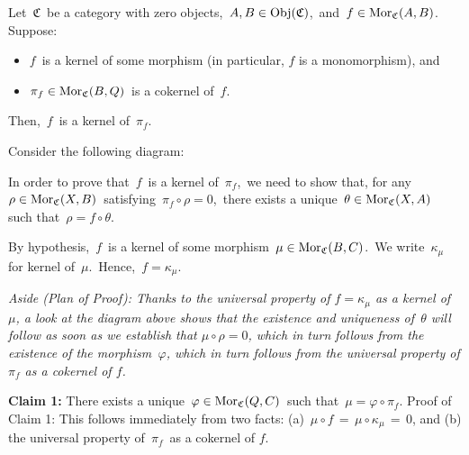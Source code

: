 \vskip 0.5cm
\begin{lemma}
\label{AMorphismIsTheKernelOfItsCokernel}
\mbox{}
\vskip 0.1cm
\noindent
Let \,$\mathfrak{C}$\, be a category with zero objects,
\,$A, B \in \textnormal{Obj}(\mathfrak{C})$,\, and
\,$f \in \textnormal{Mor}_{\mathfrak{C}}(A,B)$.\,
\vskip 0.1cm
\noindent
Suppose:
\begin{itemize}
\item
	$f$\, is a kernel of some morphism (in particular, $f$ is a monomorphism), and
\item
	$\pi_{f} \in \textnormal{Mor}_{\mathfrak{C}}(B,Q)$\, is a cokernel of \,$f$.
\end{itemize}
Then, \,$f$\, is a kernel of \,$\pi_{f}$.
\end{lemma}
\proof
Consider the following diagram:
\begin{center}
\end{center}
In order to prove that \,$f$\, is a kernel of \,$\pi_{f}$,\,
we need to show that, for any \,$\rho \in \textnormal{Mor}_{\mathfrak{C}}(X,B)$\,
satisfying \,$\pi_{f} \circ \rho = 0$,\,
there exists a unique \,$\theta \in \textnormal{Mor}_{\mathfrak{C}}(X,A)$\,
such that \,$\rho = f \circ \theta$.\,

\vskip 0.3cm
\noindent
By hypothesis, \,$f$\, is a kernel of some morphism \,$\mu \in \textnormal{Mor}_{\mathfrak{C}}(B,C)$.\,
We write \,$\kappa_{\mu}$\, for kernel of \,$\mu$.\, Hence, \,$f = \kappa_{\mu}$.

\vskip 0.3cm
\noindent
\textit{Aside (Plan of Proof):
Thanks to the universal property of $f = \kappa_{\mu}$ as a kernel of $\mu$,
a look at the diagram above shows that
the existence and uniqueness of \,$\theta$ will follow as soon as we establish
that $\mu \circ \rho = 0$, which in turn follows from the existence of the morphism \,$\varphi$,
which in turn follows from the universal property of $\pi_{f}$ as a cokernel of $f$.}

\vskip 0.3cm
\noindent
\textbf{Claim 1:}\;\; There exists a unique \,$\varphi \in \textnormal{Mor}_{\mathfrak{C}}(Q,C)$\, such that \,$\mu = \varphi \circ \pi_{f}$.
\vskip 0.1cm
\noindent
Proof of Claim 1:\;
This follows immediately from two facts:
(a)	\,$\mu \circ f \,=\, \mu \circ \kappa_{\mu} \,=\, 0$, and
(b)	the universal property of \,$\pi_{f}$\, as a cokernel of $f$.

